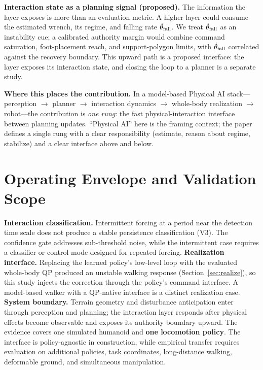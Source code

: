 \documentclass[journal]{IEEEtran}
\begin{document}
\textbf{Interaction state as a planning signal (proposed).} The information the layer exposes is more than an evaluation metric. 
A higher layer could consume the estimated wrench, its regime, and falling rate $\dot\theta_{\rm fall}$. We treat $\dot\theta_{\rm fall}$ as an instability cue; a calibrated authority margin would combine command saturation, foot-placement reach, and support-polygon limits, with $\dot\theta_{\rm fall}$ correlated against the recovery boundary. This upward path is a proposed interface: the layer exposes its interaction state, and closing the loop to a planner is a separate study.

\textbf{Where this places the contribution.} In a model-based Physical AI stack---perception $\rightarrow$ planner $\rightarrow$ interaction dynamics $\rightarrow$ whole-body realization $\rightarrow$ robot---the contribution is \emph{one rung}: the fast physical-interaction interface between planning updates. ``Physical AI'' here is the framing context; the paper defines a single rung with a clear responsibility (estimate, reason about regime, stabilize) and a clear interface above and below.

\section{Operating Envelope and Validation Scope}
\label{sec:limits}

\textbf{Interaction classification.} Intermittent forcing at a period near the
detection time scale does not produce a stable persistence classification
(V3). The confidence gate addresses sub-threshold noise, while the intermittent
case requires a classifier or control mode designed for repeated forcing.
\textbf{Realization interface.} Replacing the learned policy's low-level loop
with the evaluated whole-body QP produced an unstable walking response
(Section~\ref{sec:realize}), so this study injects the correction through the
policy's command interface. A model-based walker with a QP-native interface is
a distinct realization case.
\textbf{System boundary.} Terrain geometry and disturbance anticipation enter
through perception and planning; the interaction layer responds after physical
effects become observable and exposes its authority boundary upward.
The evidence covers one simulated humanoid and \textbf{one locomotion policy}.
The interface is policy-agnostic in construction, while empirical transfer
requires evaluation on additional policies, task coordinates, long-distance
walking, deformable ground, and simultaneous manipulation.
\end{document}

